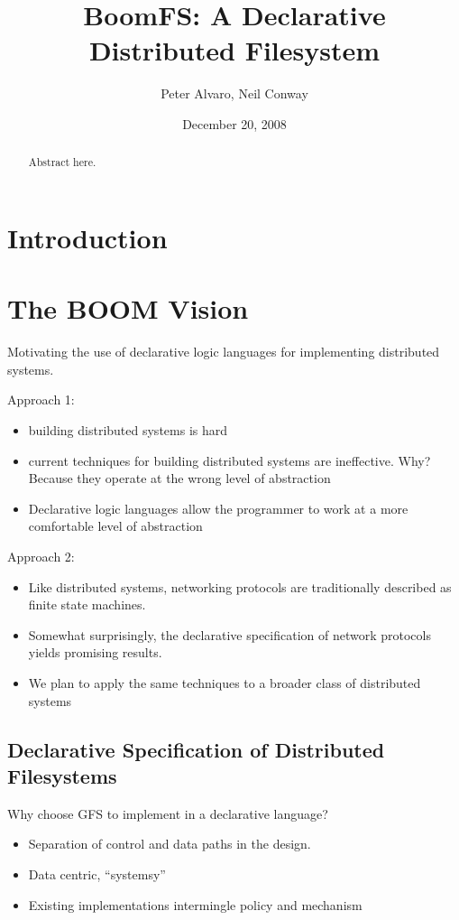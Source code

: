 \documentclass{article}
\title{BoomFS: A Declarative Distributed Filesystem}
\author{Peter Alvaro, Neil Conway}
\date{December 20, 2008}
\begin{document}
\maketitle
\begin{abstract}
Abstract here.
\end{abstract}
\section{Introduction}

\section{The BOOM Vision}
Motivating the use of declarative logic languages for implementing
distributed systems.

Approach 1:
\begin{itemize}
\item
  building distributed systems is hard

\item
  current techniques for building distributed systems are
  ineffective. Why? Because they operate at the wrong level of
  abstraction

\item
  Declarative logic languages allow the programmer to work at a more
  comfortable level of abstraction
\end{itemize}

Approach 2:
\begin{itemize}
\item
  Like distributed systems, networking protocols are traditionally
  described as finite state machines.

\item 
  Somewhat surprisingly, the declarative specification of network
  protocols yields promising results.

\item 
  We plan to apply the same techniques to a broader class of
  distributed systems
\end{itemize}

\subsection{Declarative Specification of Distributed Filesystems}
Why choose GFS to implement in a declarative language?
\begin{itemize}
\item
  Separation of control and data paths in the design.

\item
  Data centric, ``systemsy''

\item
  Existing implementations intermingle policy and mechanism
\end{itemize}
\end{document}
